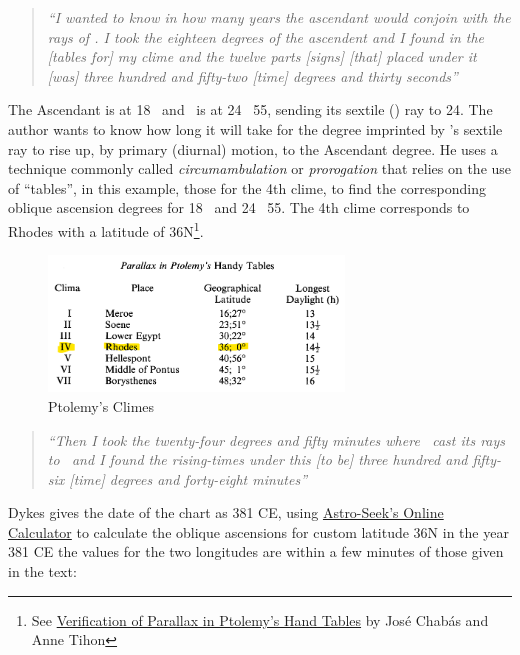 \begin{quote}
\textsl{``I wanted to know in how many years the ascendant would conjoin with the rays of \Mars. I took the eighteen degrees of the ascendent and I found in the [tables for] my clime and the twelve parts [signs] [that] placed under it [was] three hundred and fifty-two [time] degrees and thirty seconds''}
\end{quote}

The Ascendant is at 18 \Pisces\, and \Mars\, is at 24 \Taurus\, 55, sending its sextile (\Sextile) ray to 24. The author wants to know how long it will take for the degree imprinted by \Mars's sextile ray to rise up, by primary (diurnal) motion, to the Ascendant degree. He uses a technique commonly called \textsl{circumambulation} or \textsl{prorogation} that relies on the use of ``tables'', in this example, those for the 4th clime, to find the corresponding oblique ascension degrees for 18 \Pisces\, and 24 \Taurus\, 55. The 4th clime corresponds to Rhodes with a latitude of 36N\footnote{See \href{https://journals.sagepub.com/doi/10.1177/002182869302400105}{Verification of Parallax in Ptolemy's Hand Tables} by José Chabás and Anne Tihon }.

\begin{figure}[H]
\centering
\includegraphics[width=0.7\textwidth]{diagrams/Ptolemy-climes}
\vspace{-0.5em}
\caption{Ptolemy's Climes}
\end{figure}

\begin{quote}
\textsl{``Then  I took the twenty-four degrees and fifty minutes where \Mars\, cast its rays to \Pisces\, and I found the rising-times under this [to be] three hundred and fifty-six [time] degrees and forty-eight minutes''}
\end{quote}

Dykes gives the date of the chart as 381 CE, using \href{https://horoscopes.astro-seek.com/calculate-ascensional-rising-times/?latitude=100&narozeni_lat_custom_stupne=36&narozeni_lat_custom_minuty=0&narozeni_lat_custom_smer=0&narozeni_rok=381&aya=&oa=4&decimal=1}{Astro-Seek's Online Calculator} to calculate the oblique ascensions for custom latitude 36N in the year 381 CE the values for the two longitudes are within a few minutes of those given in the text:

